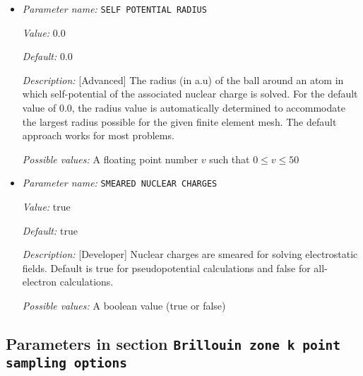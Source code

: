 \begin{itemize}
{\it Value:} false


{\it Default:} false


{\it Description:} [Standard] Flag to set point wise multipole boundary conditions (upto quadrupole term) for non-periodic systems.


{\it Possible values:} A boolean value (true or false)
\item {\it Parameter name:} {\tt SELF POTENTIAL RADIUS}
\label{parameters:Boundary conditions/SELF POTENTIAL RADIUS}
\label{parameters:Boundary_20conditions/SELF_20POTENTIAL_20RADIUS}


{\it Value:} 0.0


{\it Default:} 0.0


{\it Description:} [Advanced] The radius (in a.u) of the ball around an atom in which self-potential of the associated nuclear charge is solved. For the default value of 0.0, the radius value is automatically determined to accommodate the largest radius possible for the given finite element mesh. The default approach works for most problems.


{\it Possible values:} A floating point number $v$ such that $0 \leq v \leq 50$
\item {\it Parameter name:} {\tt SMEARED NUCLEAR CHARGES}
\label{parameters:Boundary conditions/SMEARED NUCLEAR CHARGES}
\label{parameters:Boundary_20conditions/SMEARED_20NUCLEAR_20CHARGES}


{\it Value:} true


{\it Default:} true


{\it Description:} [Developer] Nuclear charges are smeared for solving electrostatic fields. Default is true for pseudopotential calculations and false for all-electron calculations.


{\it Possible values:} A boolean value (true or false)
\end{itemize}

\subsection{Parameters in section \tt Brillouin zone k point sampling options}
\label{parameters:Brillouin_20zone_20k_20point_20sampling_20options}


